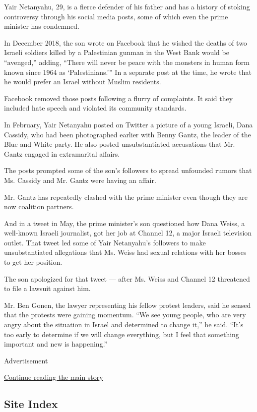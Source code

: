 Yair Netanyahu, 29, is a fierce defender of his father and has a history
of stoking controversy through his social media posts, some of which
even the prime minister has condemned.

In December 2018, the son wrote on Facebook that he wished the deaths of
two Israeli soldiers killed by a Palestinian gunman in the West Bank
would be ``avenged,'' adding, ``There will never be peace with the
monsters in human form known since 1964 as `Palestinians.''' In a
separate post at the time, he wrote that he would prefer an Israel
without Muslim residents.

Facebook removed those posts following a flurry of complaints. It said
they included hate speech and violated its community standards.

In February, Yair Netanyahu posted on Twitter a picture of a young
Israeli, Dana Cassidy, who had been photographed earlier with Benny
Gantz, the leader of the Blue and White party. He also posted
unsubstantiated accusations that Mr. Gantz engaged in extramarital
affairs.

The posts prompted some of the son's followers to spread unfounded
rumors that Ms. Cassidy and Mr. Gantz were having an affair.

Mr. Gantz has repeatedly clashed with the prime minister even though
they are now coalition partners.

And in a tweet in May, the prime minister's son questioned how Dana
Weiss, a well-known Israeli journalist, got her job at Channel 12, a
major Israeli television outlet. That tweet led some of Yair Netanyahu's
followers to make unsubstantiated allegations that Ms. Weiss had sexual
relations with her bosses to get her position.

The son apologized for that tweet --- after Ms. Weiss and Channel 12
threatened to file a lawsuit against him.

Mr. Ben Gonen, the lawyer representing his fellow protest leaders, said
he sensed that the protests were gaining momentum. ``We see young
people, who are very angry about the situation in Israel and determined
to change it,'' he said. ``It's too early to determine if we will change
everything, but I feel that something important and new is happening.''

Advertisement

\protect\hyperlink{after-bottom}{Continue reading the main story}

\hypertarget{site-index}{%
\subsection{Site Index}\label{site-index}}

